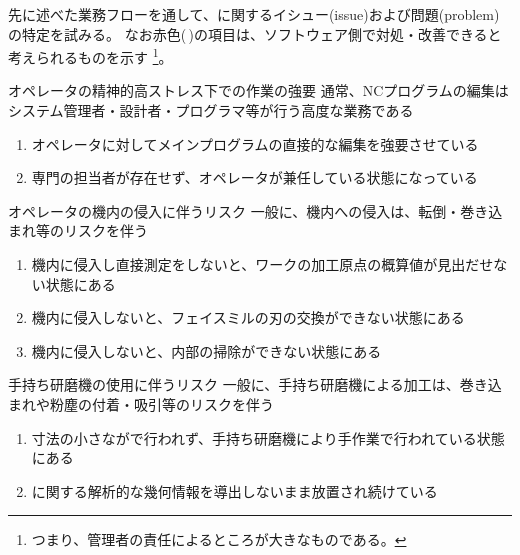 

先に述べた業務フローを通して、\MMC に関するイシュー(issue)および問題(problem)の特定を試みる。
なお{\color{red}赤色}(\,\sarrow[red]\!)の項目は、ソフトウェア側で対処・改善できると考えられるものを示す
\footnote{つまり、管理者の責任によるところが大きなものである。}。




\begin{Issues}{オペレータの精神的高ストレス下での作業の強要}
通常、NCプログラムの編集はシステム管理者・設計者・プログラマ等が行う高度な業務である
\begin{enumerate}[label=\sarrow]
\item[{\sarrow[red]}]オペレータに対してメインプログラムの直接的な編集を強要させている
\item[{\sarrow[red]}]専門の担当者が存在せず、オペレータが兼任している状態になっている
\end{enumerate}
\end{Issues}

\begin{Issues}{オペレータの機内の侵入に伴うリスク}
一般に、機内への侵入は、転倒・巻き込まれ等のリスクを伴う
\begin{enumerate}[label=\sarrow]
\item[{\sarrow[red]}]機内に侵入し直接測定をしないと、ワークの加工原点の概算値が見出だせない状態にある
\item[{\sarrow[red]}]機内に侵入しないと、フェイスミルの刃の交換ができない状態にある
\item 機内に侵入しないと、内部の掃除ができない状態にある
\end{enumerate}
\end{Issues}

\begin{Issues}{手持ち研磨機の使用に伴うリスク}
一般に、手持ち研磨機による加工は、巻き込まれや粉塵の付着・吸引等のリスクを伴う
\begin{enumerate}[label=\sarrow]
\item[{\sarrow[red]}]寸法の小さな\EndFaceChamferMilling が\MMC で行われず、手持ち研磨機により手作業で行われている状態にある
\item[{\sarrow[red]}]\EndFaceChamferMilling に関する解析的な幾何情報を導出しないまま放置され続けている
\end{enumerate}
\end{Issues}

